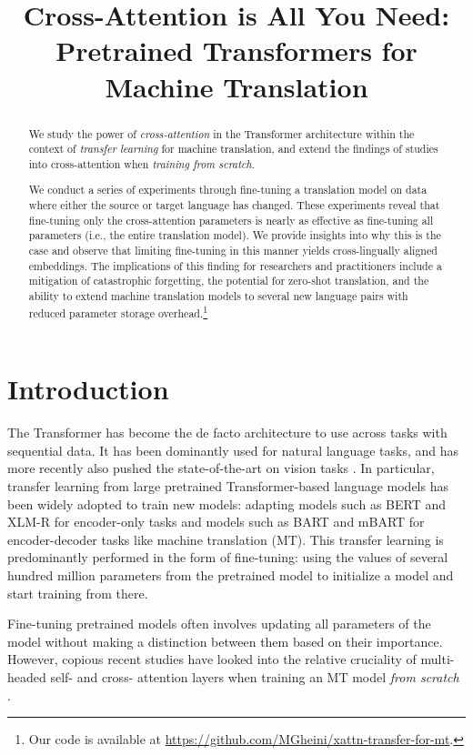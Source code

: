 \title{Cross-Attention is All You Need: Pretrained Transformers for Machine Translation}

\begin{abstract}
We study the power of \textit{cross-attention} in the Transformer architecture within the context of \textit{transfer learning} for machine translation, and extend the findings of studies into cross-attention when \textit{training from scratch}.

We conduct a series of experiments through fine-tuning a translation model on data where either the source or target language has changed. These experiments reveal that fine-tuning only the cross-attention parameters is nearly as effective as fine-tuning all parameters (i.e., the entire translation model). We provide insights into why this is the case and observe that limiting fine-tuning in this manner yields cross-lingually aligned embeddings. The implications of this finding for researchers and practitioners include a mitigation of catastrophic forgetting, the potential for zero-shot translation, and the ability to extend machine translation models to several new language pairs with reduced parameter storage overhead.\footnote{Our code is available at \url{https://github.com/MGheini/xattn-transfer-for-mt}.}
\end{abstract}

\section{Introduction}
\label{sec:intro}

The Transformer \cite{NIPS2017_3f5ee243} has become the de facto architecture to use across tasks with sequential data. It has been dominantly used for natural language tasks, and has more recently also pushed the state-of-the-art on vision tasks \cite{dosovitskiy2021an}. In particular, transfer learning from large pretrained Transformer-based language models has been widely adopted to train new models: adapting models such as BERT \cite{devlin-etal-2019-bert} and XLM-R \cite{conneau-etal-2020-unsupervised} for encoder-only tasks and models such as BART \cite{lewis-etal-2020-bart} and mBART \cite{liu-etal-2020-multilingual} for encoder-decoder tasks like machine translation (MT). This transfer learning is predominantly performed in the form of fine-tuning: using the values of several hundred million parameters from the pretrained model to initialize a model and start training from there.

Fine-tuning pretrained models often involves updating all parameters of the model without making a distinction between them based on their importance. However, copious recent studies have looked into the relative cruciality of multi-headed self- and cross- attention layers when training an MT model \textit{from scratch} \cite{voita-etal-2019-analyzing,NEURIPS2019_2c601ad9,you-etal-2020-hard}.


